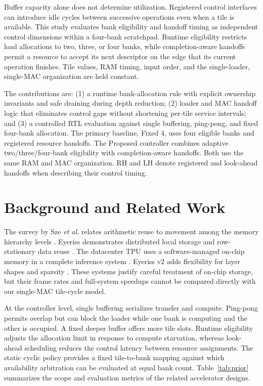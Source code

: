 \documentclass[twocolumn,10pt]{article}
\begin{document}
Buffer capacity alone does not determine utilization. Registered control
interfaces can introduce idle cycles between successive operations even
when a tile is available. This study evaluates bank eligibility and handoff
timing as independent control dimensions within a four-bank scratchpad.
Runtime eligibility restricts load allocations to two, three, or four
banks, while completion-aware handoffs permit a resource to accept its next
descriptor on the edge that its current operation finishes. Tile values,
RAM timing, input order, and the single-loader, single-MAC organization
are held constant.

The contributions are: (1) a runtime bank-allocation rule with explicit
ownership invariants and safe draining during depth reduction; (2) loader
and MAC handoff logic that eliminates control gaps without shortening
per-tile service intervals; and (3) a controlled RTL evaluation against
single buffering, ping-pong, and fixed four-bank allocation. The primary
baseline, Fixed 4, uses four eligible banks and registered resource
handoffs. The Proposed controller combines adaptive two/three/four-bank
eligibility with completion-aware handoffs. Both use the same RAM and MAC
organization. RH and LH denote registered and look-ahead handoffs when
describing their control timing.

\section{Background and Related Work}
The survey by Sze \emph{et al.} relates arithmetic reuse to movement among
the memory hierarchy levels \cite{sze2017survey}. Eyeriss demonstrates
distributed local storage and row-stationary data reuse
\cite{chen2017eyeriss}. The datacenter TPU uses a software-managed on-chip
memory in a complete inference system \cite{jouppi2017tpu}. Eyeriss v2
adds flexibility for layer shapes and sparsity \cite{chen2019eyerissv2}.
These systems justify careful treatment of on-chip storage, but their
frame rates and full-system speedups cannot be compared directly with our
single-MAC tile-cycle model.

At the controller level, single buffering serializes transfer and compute.
Ping-pong permits overlap but can block the loader while one bank is
computing and the other is occupied. A fixed deeper buffer offers more tile
slots. Runtime eligibility adjusts the allocation limit in response to
compute starvation, whereas look-ahead scheduling reduces the control
latency between resource assignments. The static cyclic policy provides
a fixed tile-to-bank mapping against which availability arbitration can be
evaluated at equal bank count. Table~\ref{tab:prior} summarizes the scope
and evaluation metrics of the related accelerator designs.
\end{document}
